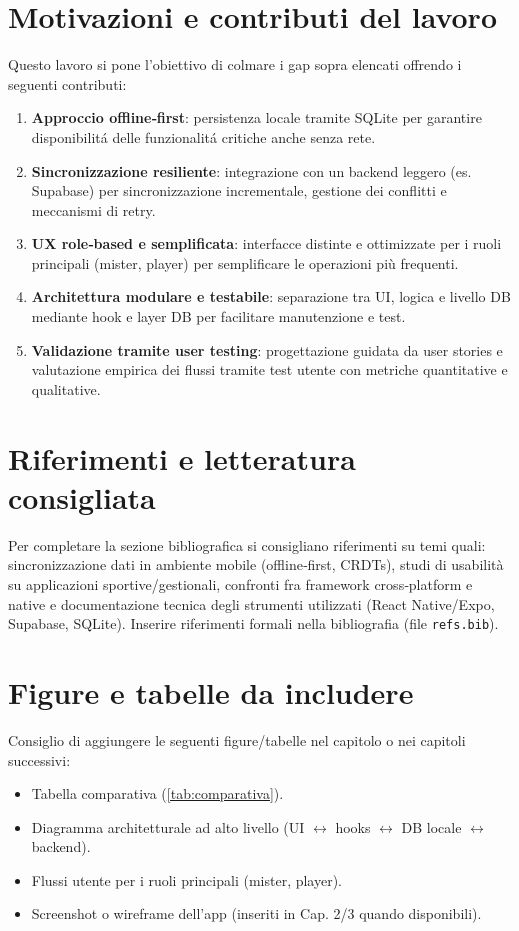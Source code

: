 \section{Motivazioni e contributi del lavoro}
Questo lavoro si pone l'obiettivo di colmare i gap sopra elencati offrendo i seguenti contributi:
\begin{enumerate}
  \item \textbf{Approccio offline‑first}: persistenza locale tramite SQLite per garantire disponibilit\'a delle funzionalit\'a critiche anche senza rete.
  \item \textbf{Sincronizzazione resiliente}: integrazione con un backend leggero (es. Supabase) per sincronizzazione incrementale, gestione dei conflitti e meccanismi di retry.
  \item \textbf{UX role‑based e semplificata}: interfacce distinte e ottimizzate per i ruoli principali (mister, player) per semplificare le operazioni pi\`u frequenti.
  \item \textbf{Architettura modulare e testabile}: separazione tra UI, logica e livello DB mediante hook e layer DB per facilitare manutenzione e test.
  \item \textbf{Validazione tramite user testing}: progettazione guidata da user stories e valutazione empirica dei flussi tramite test utente con metriche quantitative e qualitative.
\end{enumerate}

\section{Riferimenti e letteratura consigliata}
Per completare la sezione bibliografica si consigliano riferimenti su temi quali: sincronizzazione dati in ambiente mobile (offline‑first, CRDTs), studi di usabilità su applicazioni sportive/gestionali, confronti fra framework cross‑platform e native e documentazione tecnica degli strumenti utilizzati (React Native/Expo, Supabase, SQLite). Inserire riferimenti formali nella bibliografia (file \texttt{refs.bib}).

\section{Figure e tabelle da includere}
Consiglio di aggiungere le seguenti figure/tabelle nel capitolo o nei capitoli successivi:
\begin{itemize}
  \item Tabella comparativa (\autoref{tab:comparativa}).
  \item Diagramma architetturale ad alto livello (UI $\leftrightarrow$ hooks $\leftrightarrow$ DB locale $\leftrightarrow$ backend).
  \item Flussi utente per i ruoli principali (mister, player).
  \item Screenshot o wireframe dell'app (inseriti in Cap. 2/3 quando disponibili).
\end{itemize}

